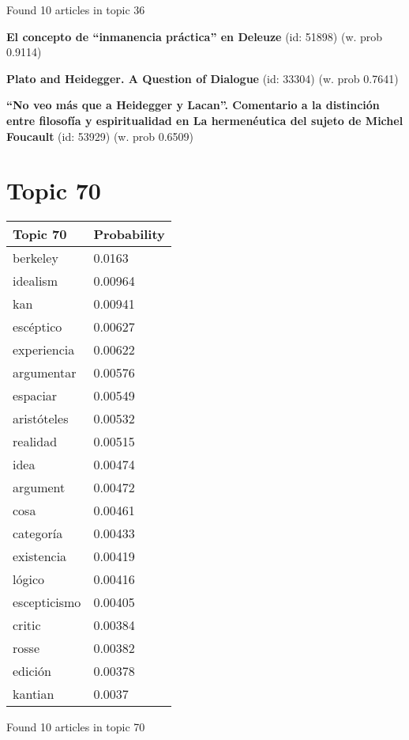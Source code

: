 \documentclass{article}
\begin{document}
\vfill
Found 10 articles in topic 36
\vfill

\textbf{El concepto de “inmanencia práctica” en Deleuze} (id: 51898)
 (w. prob 0.9114)
\vfill

\textbf{Plato and Heidegger. A Question of Dialogue} (id: 33304)
 (w. prob 0.7641)
\vfill

\textbf{“No veo más que a Heidegger y Lacan”. Comentario a la distinción entre filosofía y espiritualidad en La hermenéutica del sujeto de Michel Foucault} (id: 53929)
 (w. prob 0.6509)

\vfill
\newpage


\centering
\thispagestyle{empty}
\section*{Topic 70}\vfill
\begin{tabular}{ll}
\toprule
     Topic 70 & Probability \\
\midrule
     berkeley &      0.0163 \\
     idealism &     0.00964 \\
          kan &     0.00941 \\
    escéptico &     0.00627 \\
  experiencia &     0.00622 \\
   argumentar &     0.00576 \\
     espaciar &     0.00549 \\
  aristóteles &     0.00532 \\
     realidad &     0.00515 \\
         idea &     0.00474 \\
     argument &     0.00472 \\
         cosa &     0.00461 \\
    categoría &     0.00433 \\
   existencia &     0.00419 \\
       lógico &     0.00416 \\
 escepticismo &     0.00405 \\
       critic &     0.00384 \\
        rosse &     0.00382 \\
      edición &     0.00378 \\
      kantian &      0.0037 \\
\bottomrule
\end{tabular}

\vfill
Found 10 articles in topic 70
\vfill
\end{document}
